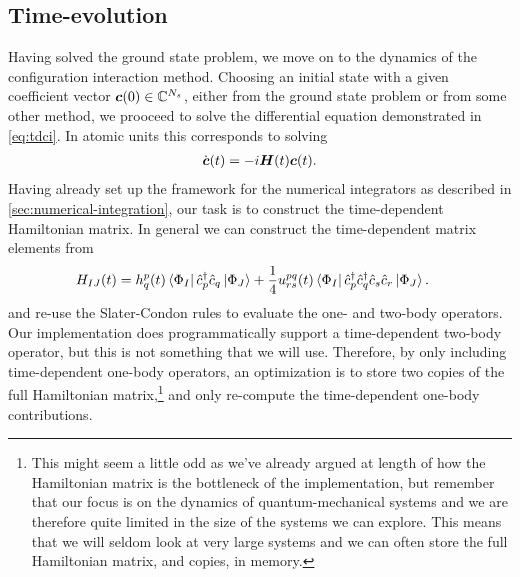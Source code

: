         \subsection{Time-evolution}
            Having solved the ground state problem, we move on to the dynamics
            of the configuration interaction method.
            Choosing an initial state with a given coefficient vector
            $\boldsymbol{c}(0) \in \mathbb{C}^{N_s}$, either from the ground state
            problem or from some other method, we prooceed to solve the
            differential equation demonstrated in \autoref{eq:tdci}.
            In atomic units this corresponds to solving
            \begin{align}
                \dot{\boldsymbol{c}}(t) = -i\boldsymbol{H}(t)\boldsymbol{c}(t).
            \end{align}
            Having already set up the framework for the numerical integrators as
            described in \autoref{sec:numerical-integration}, our task is to
            construct the time-dependent Hamiltonian matrix.
            In general we can construct the time-dependent matrix elements from
            \begin{align}
                H_{IJ}(t)
                &=
                h^{p}_{q}(t)
                \bra{\Phi_I}\hat{c}_{p}^{\dagger}\hat{c}_{q}\ket{\Phi_J}
                + \frac{1}{4}u^{pq}_{rs}(t)
                \bra{\Phi_I}\hat{c}_{p}^{\dagger}\hat{c}_{q}^{\dagger}\hat{c}_{s}\hat{c}_{r}\ket{\Phi_J}.
            \end{align}
            and re-use the Slater-Condon rules to evaluate the one- and two-body
            operators.
            Our implementation does programmatically support a time-dependent
            two-body operator, but this is not something that we will use.
            Therefore, by only including time-dependent one-body operators, an
            optimization is to store two copies of the full Hamiltonian
            matrix,\footnote{%
                This might seem a little odd as we've already argued at length
                of how the Hamiltonian matrix is the bottleneck of the
                implementation, but remember that our focus is on the dynamics
                of quantum-mechanical systems and we are therefore quite limited
                in the size of the systems we can explore.
                This means that we will seldom look at very large systems and we
                can often store the full Hamiltonian matrix, and copies, in
                memory.
            }
            and only re-compute the time-dependent one-body contributions.
